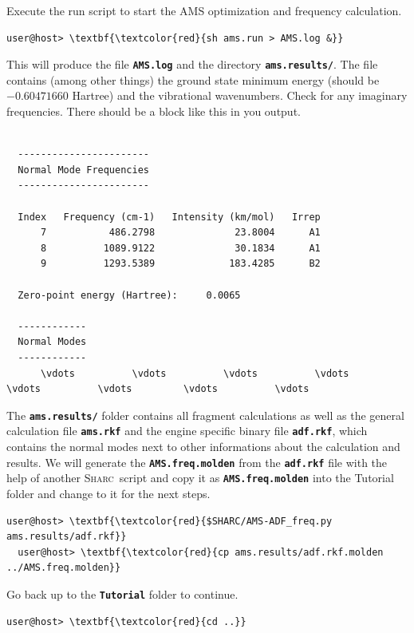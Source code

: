 \documentclass[a4paper,11pt,DIV=15,openany]{scrbook}
\newcommand{\sharc}{\textsc{Sharc}}
\newcommand{\ttt}[1]{\textbf{\texttt{#1}}}
\begin{document}
\normalsize

Execute the run script to start the \textsc{AMS} optimization and frequency calculation.
\begin{Verbatim}[commandchars=\\\{\}]
user@host> \textbf{\textcolor{red}{sh ams.run > AMS.log &}}
\end{Verbatim}
This will produce the file \ttt{AMS.log} and the directory \ttt{ams.results/}. 
The file contains (among other things) the ground state minimum energy (should be $-0.60471660$ Hartree) and the vibrational wavenumbers. 
Check for any imaginary frequencies.
There should be a block like this in you output.
\begin{oframed}
\footnotesize\begin{Verbatim}[commandchars=\\\{\}]

  -----------------------
  Normal Mode Frequencies
  -----------------------
 
  Index   Frequency (cm-1)   Intensity (km/mol)   Irrep
      7           486.2798              23.8004      A1
      8          1089.9122              30.1834      A1
      9          1293.5389             183.4285      B2
 
  Zero-point energy (Hartree):     0.0065
 
  ------------
  Normal Modes
  ------------
      \vdots          \vdots          \vdots          \vdots         \vdots          \vdots         \vdots          \vdots
\end{Verbatim}
\end{oframed}

\normalsize
The \ttt{ams.results/} folder contains all fragment calculations as well as the general calculation file \ttt{ams.rkf} and the engine specific binary file \ttt{adf.rkf}, which contains the normal modes next to other informations about the calculation and results. 
We will generate the \ttt{AMS.freq.molden} from the \ttt{adf.rkf} file with the help of another \sharc\ script and copy it as \ttt{AMS.freq.molden} into the Tutorial folder and change to it for the next steps.

\begin{Verbatim}[commandchars=\\\{\}]
  user@host> \textbf{\textcolor{red}{$SHARC/AMS-ADF_freq.py ams.results/adf.rkf}}
  user@host> \textbf{\textcolor{red}{cp ams.results/adf.rkf.molden ../AMS.freq.molden}}
\end{Verbatim}
Go back up to the \ttt{Tutorial} folder to continue.
\begin{Verbatim}[commandchars=\\\{\}]
user@host> \textbf{\textcolor{red}{cd ..}}
\end{Verbatim}
\end{document}

